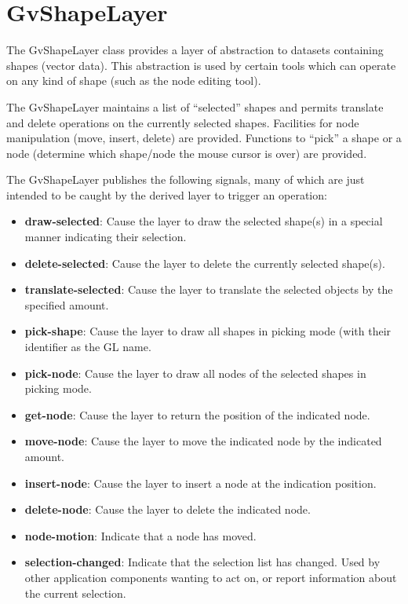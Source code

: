 \documentclass{openevreport}
\begin{document}
\section{GvShapeLayer}

The GvShapeLayer class provides a layer of abstraction to datasets
containing shapes (vector data).  This abstraction is used by certain
tools which can operate on any kind of shape (such as the node editing 
tool).

The GvShapeLayer maintains a list of ``selected'' shapes and permits
translate and delete operations on the currently selected shapes.
Facilities for node manipulation (move, insert, delete) are provided.
Functions to ``pick'' a shape or a node (determine which shape/node
the mouse cursor is over) are provided.

The GvShapeLayer publishes the following signals, many of which are
just intended to be caught by the derived layer to trigger an operation:

\begin{itemize}

\item {\bf draw-selected}: Cause the layer to draw the selected shape(s) in
a special manner indicating their selection.  

\item {\bf delete-selected}: Cause the layer to delete the currently selected
shape(s). 

\item {\bf translate-selected}: Cause the layer to 
translate the selected objects by the specified amount. 

\item {\bf pick-shape}: Cause the layer to draw all shapes in picking mode
(with their identifier as the GL name. 

\item {\bf pick-node}: Cause the layer to draw all nodes of the selected
shapes in picking mode.

\item {\bf get-node}: Cause the layer to return the position of the indicated
node. 

\item {\bf move-node}: Cause the layer to move the indicated node by the 
indicated amount.

\item {\bf insert-node}: Cause the layer to insert a node at the indication
position.

\item {\bf delete-node}: Cause the layer to delete the indicated node.

\item {\bf node-motion}: Indicate that a node has moved. 

\item {\bf selection-changed}: Indicate that the selection list has 
changed.  Used by other application components wanting to act on, or report
information about the current selection.

\end{itemize}
\end{document}
